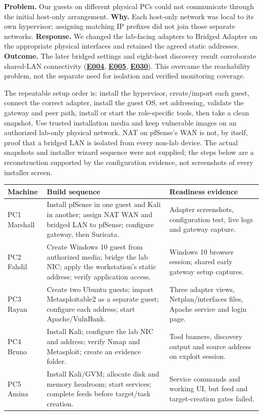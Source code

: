 \documentclass[11pt,a4paper]{article}
\newcommand{\ev}[1]{\hyperref[ev:#1]{\textbf{#1}}}
\begin{document}
\begin{troublebox}
\textbf{Problem.} Our guests on different physical PCs could not communicate through the initial host-only arrangement. \textbf{Why.} Each host-only network was local to its own hypervisor; assigning matching IP prefixes did not join those separate networks. \textbf{Response.} We changed the lab-facing adapters to Bridged Adapter on the appropriate physical interfaces and retained the agreed static addresses. \textbf{Outcome.} The later bridged settings and eight-host discovery result corroborate shared-LAN connectivity (\ev{E004}, \ev{E005}, \ev{E030}). This overcame the reachability problem, not the separate need for isolation and verified monitoring coverage.
\end{troublebox}

The repeatable setup order is: install the hypervisor, create/import each guest, connect the correct adapter, install the guest OS, set addressing, validate the gateway and peer path, install or start the role-specific tools, then take a clean snapshot. Use trusted installation media and keep vulnerable images on an authorized lab-only physical network. NAT on pfSense's WAN is not, by itself, proof that a bridged LAN is isolated from every non-lab device. The actual snapshots and installer wizard sequence were not supplied; the steps below are a reconstruction supported by the configuration evidence, not screenshots of every installer screen.

\begin{tabularx}{\linewidth}{@{}L{2.9cm}X X@{}}
\toprule
\textbf{Machine} & \textbf{Build sequence} & \textbf{Readiness evidence}\\
\midrule
PC1 Marshall & Install pfSense in one guest and Kali in another; assign NAT WAN and bridged LAN to pfSense; configure gateway, then Suricata. & Adapter screenshots, configuration test, live logs and gateway capture.\\
PC2 Fahdil & Create Windows 10 guest from authorized media; bridge the lab NIC; apply the workstation's static address; verify application access. & Windows 10 browser session; shared early gateway setup captures.\\
PC3 Rayan & Create two Ubuntu guests; import Metasploitable2 as a separate guest; configure each address; start Apache/VulnBank. & Three adapter views, Netplan/interfaces files, Apache service and login page.\\
PC4 Bruno & Install Kali; configure the lab NIC and address; verify Nmap and Metasploit; create an evidence folder. & Tool banners, discovery output and source address on exploit session.\\
PC5 Amina & Install Kali/GVM; allocate disk and memory headroom; start services; complete feeds before target/task creation. & Service commands and working UI, but feed and target-creation gates failed.\\
\bottomrule
\end{tabularx}
\end{document}

